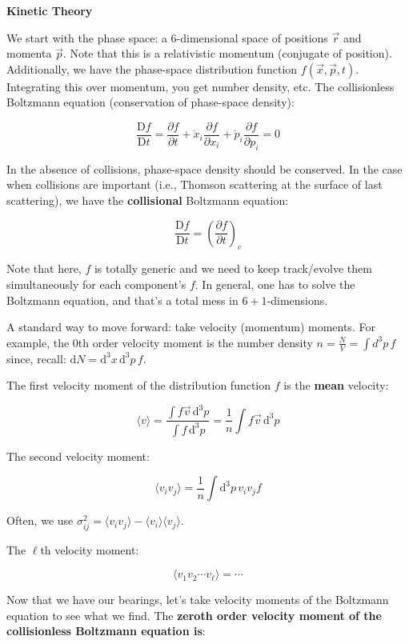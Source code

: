 \documentclass{article}
\newcommand{\be}{\begin{equation}}
\newcommand{\ee}{\end{equation}}
\begin{document}
\noindent\textbf{Kinetic Theory}

We start with the phase space: a 6-dimensional space of positions $\vec{r}$ and momenta $\vec{p}$. Note that this is a relativistic momentum (conjugate of position). Additionally, we have the phase-space distribution function $f(\vec{x},\vec{p},t)$. Integrating this over momentum,  you get number density, etc. The collisionless Boltzmann equation (conservation of phase-space density):

\be
\frac{\mathrm{D} f}{\mathrm{D} t} = \frac{\partial f}{\partial t} + \dot{x}_i \frac{\partial f}{\partial x_i} + \dot{p}_i \frac{\partial f}{\partial p_i} = 0 
\ee

In the absence of collisions, phase-space density should be conserved. In the case when collisions are important (i.e., Thomson scattering at the surface of last scattering), we have the \textbf{collisional} Boltzmann equation:

\be
\frac{\mathrm{D} f}{\mathrm{D} t} = \left(\frac{\partial f}{\partial t}\right)_c
\ee

Note that here, $f$ is totally generic and we need to keep track/evolve them simultaneously for each component's $f$. In general, one has to solve the Boltzmann equation, and that's a total mess in $6+1$-dimensions. 

A standard way to move forward: take velocity (momentum) moments. For example, the $0$th order velocity moment is the number density $n = \frac{N}{V} = \int d^3 p \, f$ since, recall: $\mathrm{d}N = \mathrm{d}^3 x \, \mathrm{d}^3 p \, f$. 

The first velocity moment of the distribution function $f$ is the \textbf{mean} velocity:

\be
\langle v \rangle = \frac{\int f\vec{v}\,\mathrm{d}^3 p}{\int f\,\mathrm{d}^3 p} = \frac{1}{n} \int f\vec{v}\,\mathrm{d}^3 p
\ee

The second velocity moment:

\be
\langle v_i v_j \rangle = \frac{1}{n} \int \mathrm{d}^3 p \, v_i v_j f
\ee

Often, we use $\sigma_{ij}^2 = \langle v_i v_j \rangle - \langle v_i \rangle \langle v_j \rangle$.

The $\ell$th velocity moment:

\be
\langle v_1 v_2 \cdots v_\ell \rangle = \cdots
\ee

Now that we have our bearings, let's take velocity moments of the Boltzmann equation to see what we find. The \textbf{zeroth order velocity moment of the collisionless Boltzmann equation is}:
\end{document}
